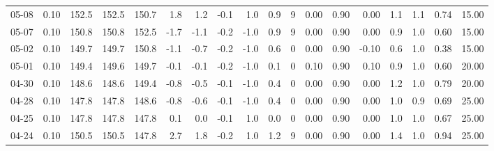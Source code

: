 \begin{threeparttable}
{\begin{tabular}{lrrrrrrrrrrrrrrrrr}
  05-08 &     0.10 & 152.5 & 152.5 & 150.7 &        1.8 &            1.2 &                      -0.1 &                      1.0 &                 0.9 &              9 &       0.00 &      0.90 &           0.00 &              1.1 &                 1.1 &            0.74 &                  15.00 \\
  05-07 &     0.10 & 150.8 & 150.8 & 152.5 &       -1.7 &           -1.1 &                      -0.2 &                     -1.0 &                 0.9 &              9 &       0.00 &      0.90 &           0.00 &              0.9 &                 1.0 &            0.60 &                  15.00 \\
  05-02 &     0.10 & 149.7 & 149.7 & 150.8 &       -1.1 &           -0.7 &                      -0.2 &                     -1.0 &                 0.6 &              0 &       0.00 &      0.90 &          -0.10 &              0.6 &                 1.0 &            0.38 &                  15.00 \\
  05-01 &     0.10 & 149.4 & 149.6 & 149.7 &       -0.1 &           -0.1 &                      -0.2 &                     -1.0 &                 0.1 &              0 &       0.10 &      0.90 &           0.10 &              0.9 &                 1.0 &            0.60 &                  20.00 \\
  04-30 &     0.10 & 148.6 & 148.6 & 149.4 &       -0.8 &           -0.5 &                      -0.1 &                     -1.0 &                 0.4 &              0 &       0.00 &      0.90 &           0.00 &              1.2 &                 1.0 &            0.79 &                  20.00 \\
  04-28 &     0.10 & 147.8 & 147.8 & 148.6 &       -0.8 &           -0.6 &                      -0.1 &                     -1.0 &                 0.4 &              0 &       0.00 &      0.90 &           0.00 &              1.0 &                 0.9 &            0.69 &                  25.00 \\
  04-25 &     0.10 & 147.8 & 147.8 & 147.8 &        0.1 &            0.0 &                      -0.1 &                      1.0 &                 0.0 &              0 &       0.00 &      0.90 &           0.00 &              1.0 &                 1.0 &            0.67 &                  25.00 \\
  04-24 &     0.10 & 150.5 & 150.5 & 147.8 &        2.7 &            1.8 &                      -0.2 &                      1.0 &                 1.2 &              9 &       0.00 &      0.90 &           0.00 &              1.4 &                 1.0 &            0.94 &                  25.00 \\

\end{tabular}}
\end{threeparttable}
